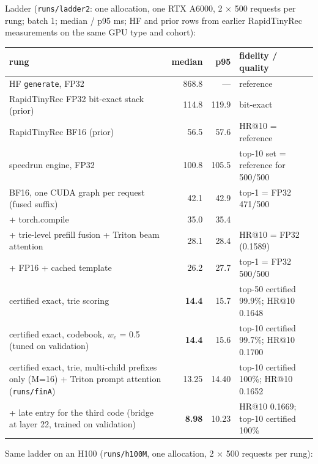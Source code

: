 \documentclass[11pt]{article}
\newcommand{\code}[1]{\texttt{#1}}
\begin{document}
Ladder (\code{runs/\allowbreak{}ladder2}: one allocation, one RTX A6000, 2 × 500 requests per rung; batch 1; median / p95 ms; HF and prior rows from earlier RapidTinyRec measurements on the same GPU type and cohort):

{\small
\setlength{\tabcolsep}{4pt}
\begin{xltabular}{\linewidth}{>{\raggedright\arraybackslash{}\hsize}Xrr>{\raggedright\arraybackslash{}\hsize}X}
\toprule
rung & median & p95 & fidelity / quality \\
\midrule
\endhead
HF \code{generate}, FP32 & 868.8 & — & reference \\
RapidTinyRec FP32 bit-exact stack (prior) & 114.8 & 119.9 & bit-exact \\
RapidTinyRec BF16 (prior) & 56.5 & 57.6 & HR@10 = reference \\
speedrun engine, FP32 & 100.8 & 105.5 & top-10 set = reference for 500/500 \\
BF16, one CUDA graph per request (fused suffix) & 42.1 & 42.9 & top-1 = FP32 471/500 \\
+ torch.compile & 35.0 & 35.4 &  \\
+ trie-level prefill fusion + Triton beam attention & 28.1 & 28.4 & HR@10 = FP32 (0.1589) \\
+ FP16 + cached template & 26.2 & 27.7 & top-1 = FP32 500/500 \\
certified exact, trie scoring & \textbf{14.4} & 15.7 & top-50 certified 99.9\%; HR@10 0.1648 \\
certified exact, codebook, $w_{c}$ = 0.5 (tuned on validation) & \textbf{14.4} & 15.6 & top-10 certified 99.7\%; HR@10 0.1700 \\
certified exact, trie, multi-child prefixes only (M=16) + Triton prompt attention (\code{runs/\allowbreak{}finA}) & 13.25 & 14.40 & top-10 certified 100\%; HR@10 0.1652 \\
+ late entry for the third code (bridge at layer 22, trained on validation) & \textbf{8.98} & 10.23 & HR@10 0.1669; top-10 certified 100\% \\
\bottomrule
\end{xltabular}
}

Same ladder on an H100 (\code{runs/\allowbreak{}h100M}, one allocation, 2 × 500 requests per rung):
\end{document}
